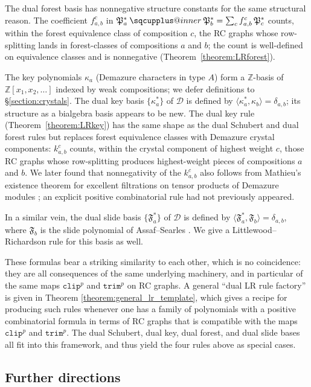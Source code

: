 \documentclass{amsart}
\makeatletter
\newcommand{\sqcupplus@inner}[2]{%
  \vcenter{\hbox{\ooalign{%
    \hfil$\m@th#1\sqcup$\hfil\cr
    \hfil\raisebox{0.15ex}{$\m@th#1\scriptscriptstyle+$}\hfil\cr
  }}}%
}
\newcommand{\sqcupplus}{\mathbin{\mathpalette\sqcupplus@inner\relax}}
\theoremstyle{definition}
\theoremstyle{remark}
\numberwithin{equation}{subsection}
\newcommand{\trm}{\mathtt{trim}}
\newcommand{\clp}{\mathtt{clip}}
\newcommand{\slide}{\mathfrak{F}}
\newcommand{\dcoma}{\mathcal{D}}
\newcommand{\forest}{\mathfrak{P}}
\makeatother
\begin{document}
The dual forest basis has nonnegative structure constants for the same structural reason. The coefficient $f_{a,b}^c$ in $\forest_a^*\sqcupplus\forest_b^*=\sum_c f_{a,b}^c\,\forest_c^*$ counts, within the forest equivalence class of composition $c$, the RC graphs whose row-splitting lands in forest-classes of compositions $a$ and $b$; the count is well-defined on equivalence classes and is nonnegative (Theorem~\ref{theorem:LRforest}).

The key polynomials $\kappa_a$ (Demazure characters in type $A$) form a $\mathbb{Z}$-basis of $\mathbb{Z}[x_1,x_2,\ldots]$ indexed by weak compositions; we defer definitions to \S\ref{section:crystals}. The dual key basis $\{\kappa_a^*\}$ of $\dcoma$ is defined by $\langle\kappa_a^*,\kappa_b\rangle=\delta_{a,b}$; its structure as a bialgebra basis appears to be new. The dual key rule (Theorem~\ref{theorem:LRkey}) has the same shape as the dual Schubert and dual forest rules but replaces forest equivalence classes with Demazure crystal components: $k_{a,b}^c$ counts, within the crystal component of highest weight $c$, those RC graphs whose row-splitting produces highest-weight pieces of compositions $a$ and $b$. We later found that nonnegativity of the $k_{a,b}^c$ also follows from Mathieu's existence theorem for excellent filtrations on tensor products of Demazure modules \cite{mathieu1990filtrations}; an explicit positive combinatorial rule had not previously appeared.

In a similar vein, the dual slide basis $\{\slide_a^*\}$ of $\dcoma$ is defined by $\langle\slide_a^*,\slide_b\rangle=\delta_{a,b}$, where $\slide_b$ is the slide polynomial of Assaf--Searles \cite{assaf2017slide}. We give a Littlewood--Richardson rule for this basis as well.

These formulas bear a striking similarity to each other, which is no coincidence: they are all consequences of the same underlying machinery, and in particular of the same maps $\clp^p$ and $\trm^p$ on RC graphs. A general ``dual LR rule factory'' is given in Theorem \ref{theorem:general_lr_template}, which gives a recipe for producing such rules whenever one has a family of polynomials with a positive combinatorial formula in terms of RC graphs that is compatible with the maps $\clp^p$ and $\trm^p$. The dual Schubert, dual key, dual forest, and dual slide bases all fit into this framework, and thus yield the four rules above as special cases.


\subsection*{Further directions}
\end{document}
